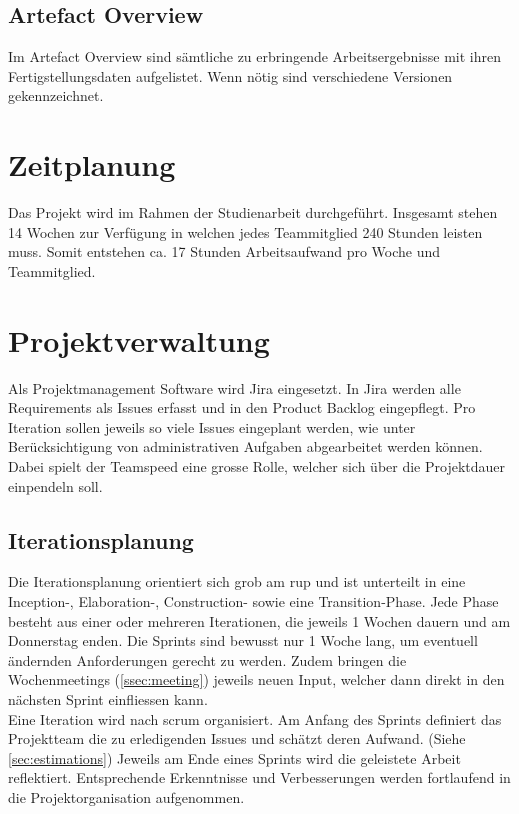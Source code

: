 \documentclass[11pt,a4paper,english,oneside]{book}
\numberwithin{equation}{chapter}
\begin{document}
	\subsection{Artefact Overview}
	Im Artefact Overview sind sämtliche zu erbringende Arbeitsergebnisse mit ihren Fertigstellungsdaten aufgelistet. Wenn nötig sind verschiedene Versionen gekennzeichnet.
	
	
	\section{Zeitplanung}
	
	Das Projekt wird im Rahmen der Studienarbeit durchgeführt. Insgesamt stehen 14 Wochen zur Verfügung in welchen jedes Teammitglied 240 Stunden leisten muss. Somit entstehen ca. 17 Stunden Arbeitsaufwand pro Woche und Teammitglied.
		
	\section{Projektverwaltung}
	
	Als Projektmanagement Software wird Jira \cite{jira} eingesetzt. In Jira werden alle Requirements als Issues erfasst und in den Product Backlog eingepflegt. Pro Iteration sollen jeweils so viele Issues eingeplant werden, wie unter Berücksichtigung von administrativen Aufgaben abgearbeitet werden können. Dabei spielt der Teamspeed eine grosse Rolle, welcher sich über die Projektdauer einpendeln soll. 

	
	\subsection{Iterationsplanung}
	Die Iterationsplanung orientiert sich grob am \gls{rup} und ist unterteilt in eine Inception-, Elaboration-, Construction- sowie eine Transition-Phase. Jede Phase besteht aus einer oder mehreren Iterationen, die jeweils 1 Wochen dauern und am Donnerstag enden. Die Sprints sind bewusst nur 1 Woche lang, um eventuell ändernden Anforderungen gerecht zu werden. Zudem bringen die Wochenmeetings (\ref{ssec:meeting}) jeweils neuen Input, welcher dann direkt in den nächsten Sprint einfliessen kann.\\
	Eine Iteration wird nach \gls{scrum} organisiert. Am Anfang des Sprints definiert das Projektteam die zu erledigenden Issues und schätzt deren Aufwand. (Siehe \ref{sec:estimations}) Jeweils am Ende eines Sprints wird die geleistete Arbeit reflektiert. Entsprechende Erkenntnisse und Verbesserungen werden fortlaufend in die Projektorganisation aufgenommen. 
		
\end{document}
